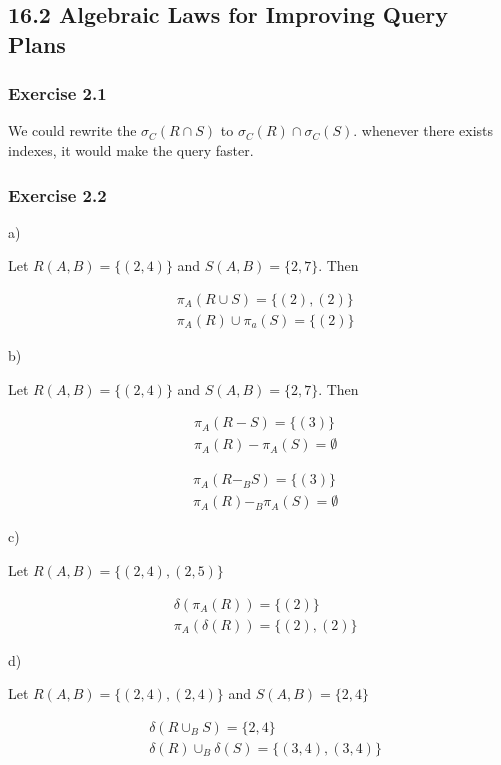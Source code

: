 \documentclass[../../main.tex]{subfiles}
\begin{document}
\subsection{16.2 Algebraic Laws for Improving Query Plans}

\subsubsection*{Exercise 2.1}

We could rewrite the $\sigma_{C}(R \cap S)$ to $\sigma_{C}(R) \cap \sigma_{C}(S)$.
whenever there exists indexes, it would make the query faster.

\subsubsection*{Exercise 2.2}

a)

Let $R(A, B) = \{(2,4)\}$ and $S(A, B) = \{2, 7\}$. Then

\begin{align*}
  &\pi_{A}(R \cup S) = \{(2), (2)\} \\
  &\pi_{A}(R) \cup \pi_{a}(S) = \{(2)\}
\end{align*}

b)

Let $R(A, B) = \{(2,4)\}$ and $S(A, B) = \{2, 7\}$. Then

\begin{align*}
  &\pi_{A}(R - S) = \{(3)\} \\
  &\pi_{A}(R) - \pi_{A}(S) = \emptyset
\end{align*}

\begin{align*}
  &\pi_{A}(R -_{B} S) = \{(3)\} \\
  &\pi_{A}(R) -_{B} \pi_{A}(S) = \emptyset
\end{align*}

c)

Let $R(A, B) = \{(2,4), (2, 5)\}$

\begin{align*}
  &\delta(\pi_{A}(R)) = \{(2)\} \\
  &\pi_{A}(\delta(R)) = \{(2), (2)\}
\end{align*}

d)

Let $R(A, B) = \{(2,4), (2, 4)\}$ and $S(A, B) = \{2, 4\}$

\begin{align*}
  &\delta(R \cup_{B} S) = \{2, 4\} \\
  &\delta(R) \cup_{B} \delta(S) = \{(3, 4), (3, 4)\}
\end{align*}
\end{document}
